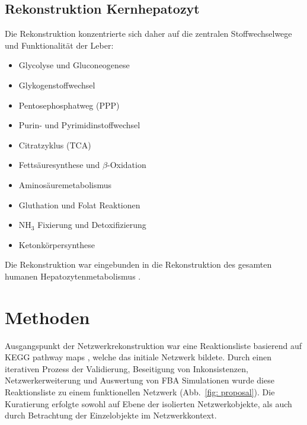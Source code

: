 \subsection{Rekonstruktion Kernhepatozyt}
\label{reconstruction_hepatocyte}
Die Rekonstruktion konzentrierte sich daher auf die zentralen Stoffwechselwege und Funktionalität der Leber:
\small
\begin{itemize}
 \item Glycolyse und Gluconeogenese  
 \item Glykogenstoffwechsel
 \item Pentosephosphatweg (PPP)
 \item Purin- und Pyrimidinstoffwechsel 
 \item Citratzyklus (TCA)
 \item Fettsäuresynthese und $\beta$-Oxidation 
 \item Aminosäuremetabolismus 
 \item Gluthation und Folat Reaktionen 
 \item $\text{NH}_3$ Fixierung und Detoxifizierung 
 \item Ketonkörpersynthese 
\end{itemize}
\normalsize
Die Rekonstruktion war eingebunden in die Rekonstruktion des gesamten humanen Hepatozytenmetabolismus \cite{Boelling2009}.

\section{Methoden}
Ausgangspunkt der Netzwerkrekonstruktion war eine Reaktionsliste basierend auf KEGG pathway maps \cite{Kanehisa2000}, welche das initiale Netzwerk bildete. Durch einen iterativen Prozess der Validierung, Beseitigung von Inkonsistenzen, Netzwerkerweiterung und Auswertung von FBA Simulationen wurde diese Reaktionsliste zu einem funktionellen Netzwerk (Abb.~\ref{fig: proposal}). Die Kuratierung erfolgte sowohl auf Ebene der isolierten Netzwerkobjekte, als auch durch Betrachtung der Einzelobjekte im Netzwerkkontext.

